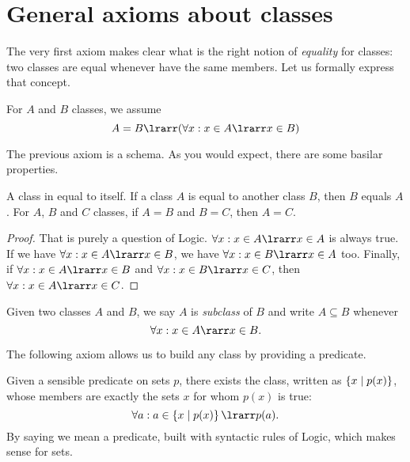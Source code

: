 
\section{General axioms about classes}

The very first axiom makes clear what is the right notion of {\em equality} for classes: two classes are equal whenever have the same members. Let us formally express that concept.

\begin{axiom}\label{axiom:Extensionality}
For \(A\) and \(B\) classes, we assume
\[A = B \lrarr (\forall x : x \in A \lrarr x \in B)\]
\end{axiom}

The previous axiom is a schema. As you would expect, there are some basilar properties.

\begin{theorem}
A class in equal to itself. If a class \(A\) is equal to another class \(B\), then \(B\) equals \(A\). For \(A\), \(B\) and \(C\) classes, if \(A = B\) and \(B = C\), then \(A = C\).
\end{theorem}

\begin{proof}
That is purely a question of Logic. \(\forall x : x \in A \lrarr x \in A\) is always true. If we have \(\forall x : x \in A \lrarr x \in B\), we have \(\forall x : x \in B \lrarr x \in A\) too. Finally, if \(\forall x : x \in A \lrarr x \in B\) and \(\forall x : x \in B \lrarr x \in C\), then \(\forall x : x \in A \lrarr x \in C\).
\end{proof}

Given two classes \(A\) and \(B\), we say \(A\) is {\em subclass} of \(B\) and write \(A \subseteq B\) whenever
\[\forall x : x \in A \rarr x \in B.\]

The following axiom allows us to build any class by providing a predicate.

\begin{axiom}\label{axiom:Abstraction}
Given a sensible predicate on sets \(p\), there exists the class, written as \(\left\{x \mid p(x)\right\}\), whose members are exactly the sets \(x\) for whom \(p(x)\) is true:
\[\forall a : a \in \set{x \mid p(x)} \lrarr p(a).\]
By saying  we mean a predicate, built with syntactic rules of Logic, which makes sense for sets.
\end{axiom}

